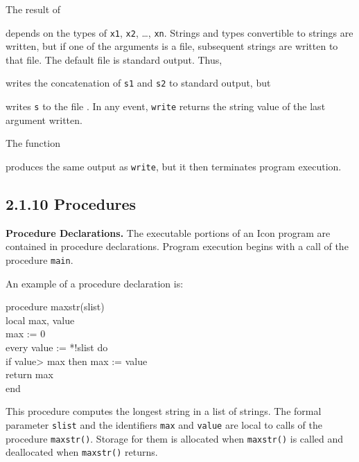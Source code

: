 The result of


\noindent depends on the types of \texttt{x1}, \texttt{x2}, \ldots,
\texttt{xn}. Strings and types convertible to strings are written, but if
one of the arguments is a file, subsequent strings are written to that
file. The default file is standard output. Thus,


\noindent
writes the concatenation of \texttt{s1} and \texttt{s2} to standard output, but


\noindent
writes \texttt{s} to the file . In any event, \texttt{write} returns
the string value of the last argument written.

The function


\noindent
produces the same output as \texttt{write}, but it then terminates program execution.


\subsection[2.1.10 Procedures]{2.1.10 Procedures}

\textbf{Procedure Declarations.} The executable portions of an Icon
program are contained in procedure declarations.  Program execution
begins with a call of the procedure \texttt{main}.

An example of a procedure declaration is:

\begin{iconcode}
\>procedure maxstr(slist)\\
\>\>local max, value\\
\>\>max := 0\\
\>\>every value := *!slist do\\
\>\>\>if value> max then max := value\\
\>\>return max\\
\>end
\end{iconcode}

\noindent This procedure computes the longest string in a list of strings.
The formal parameter \texttt{slist} and the identifiers \texttt{max} and
\texttt{value} are local to calls of the procedure \texttt{maxstr()}.
Storage for them is allocated when \texttt{maxstr()} is called and
deallocated when \texttt{maxstr()} returns.

